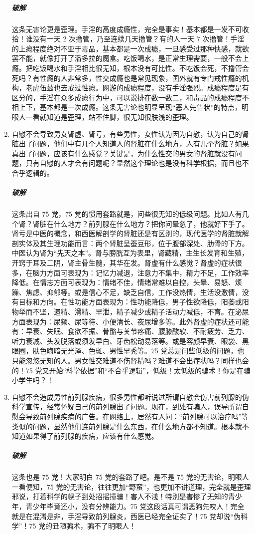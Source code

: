 \documentclass{ctexart}
\begin{document}
\begin{enumerate}
    \subparagraph{破解} 这条无害论更是歪理。手淫的高度成瘾性，完全是事实！基本都是一发不可收拾！谁没有一天 2 次撸管，乃至连续几天撸管？有的人一天 7 次撸管！手淫的上瘾程度绝对不亚于毒品，基本都是一次成瘾，一旦感受过那种快感，就欲罢不能，就像打开了潘多拉的魔盒。吃饭喝水，是正常生理需要，一般不会上瘾。把吃饭喝水和手淫相比很无知，根本没有可比性。不吃饭会死，不撸管会死吗？有性瘾的人非常多，性交成瘾也是常见现象，国外就有专门戒性瘾的机构，老虎伍兹也去戒过性瘾。网游的成瘾程度，没有手淫强烈。成瘾程度是有区分的，手淫在众多成瘾行为中，可以说排在数一数二，和毒品的成瘾程度不相上下，基本都是一次成瘾。这条无害论也明显呈现“恶人先告状”的特点，明眼人一看就知道是歪理，站不住脚，很无知很肤浅的歪理。
    \item 自慰不会导致男女肾虚、肾亏，有些男性，女性认为因为自慰，认为自己的肾脏出了问题，他们中有几个人知道人的肾脏在什么地方，人有几个肾脏？如果真出了问题，应该有什么感觉？关键是，为什么性交的男女的肾脏就没有问题，只有自慰的人才会有问题呢？显然这个理论也是没有科学根据，而且也不合乎逻辑的。
    \subparagraph{破解} 这条出自 75 党，75 党的惯用套路就是，问些很无知的低级问题。比如人有几个肾？肾脏在什么地方？前列腺在什么地方？把你问晕忽了，他就好下手了。肾亏是中医的概念，和西医解剖学的肾脏还是有区别的，现代医学的肾脏就解剖实体及其生理功能而言：两个肾脏呈蚕豆形，位于腹部深处、肋骨的下方。中医认为肾为“先天之本”。肾与膀胱互为表里，肾藏精，主生长发育和生殖，开窍于耳及二阴，肾主骨生髓，其华在发。肾虚有什么感觉？肾虚的症状很多，在脑力方面可表现为：记忆力减退，注意力不集中，精力不足，工作效率降低。在情志方面可表现为：情绪不佳，情绪常难以自控，头晕、易怒、烦躁、焦虑、抑郁等。或是信心不足，缺乏自信，工作没热情，生活没激情，没有目标和方向。在性功能方面表现为：性功能降低，男子性欲降低，阳萎或阳物举而不坚，遗精、滑精、早泄，精子减少或精子活动力减低，不育。在泌尿方面表现为：尿频、尿等待、小便清长、夜尿增多等。此外肾虚的症状还可能有：早衰、失眠、食欲不振、骨骼与关节疼痛、腰膝酸软、不耐疲劳、乏力、听力衰减、头发脱落或须发早白、牙齿松动易落等。或是容颜早衰、眼袋、黑眼圈，肤色晦暗无光泽、色斑、男性早秃等。75 党总是问些低级的问题，也只能忽悠无知的人。男女性交难道不伤肾精吗？难道不会出症状吗？同样也会的！75 党又开始“科学依据”和“不合乎逻辑”，低级！太低级的骗术！你是在骗小学生吗？！
    \item 自慰不会造成男性前列腺疾病，很多男性都听说过所谓自慰会伤害前列腺的伪科学宣传，经常怀疑自己的前列腺出了问题。现在，到处有骗人，误导所谓自慰会导致前列腺疾病的广告。在网络上，居然有人问：“前列腺可以治疗吗”等类似的问题，显然他们连前列腺是什么东西，在什么地方都不知道。根本就不知道如果得了前列腺的疾病，应该有什么感觉。
    \subparagraph{破解} 这条也是 75 党！大家明白 75 党的套路了吧。是不是 75 党的无害论，明眼人一看便知，75 党的无害论，往往更加“野蛮”，也更加不讲道理，完全就是歪理邪说，打着科学的幌子到处招摇撞骗！害人不浅！特别是害惨了无知的青少年，青少年毕竟还小，没有分辨能力。75 党这段话真可谓恶狗先咬人！完全就是在混淆是非，手淫导致前列腺炎，西医已经完全证实了！75 党却说“伪科学”！75 党的丑陋骗术，骗不了明眼人！

\end{enumerate}
\end{document}
